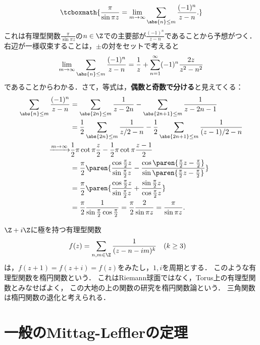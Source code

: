 \documentclass[uplatex, dvipdfmx]{jsreport}
\begin{document}
\begin{example}\mbox{}
        \[\tcboxmath{\frac{\pi}{\sin\pi z}=\lim_{m\to\infty}\sum_{\abs{n}\le m}\frac{(-1)^n}{z-n}.}\]
        これは有理型関数$\frac{\pi}{\sin\pi z}$の$n\in\Z$での主要部が$\frac{(-1)^n}{z-n}$であることから予想がつく．
    右辺が一様収束することは，$\pm$の対をセットで考えると
    \[\lim_{m\to\infty}\sum_{\abs{n}\le m}\frac{(-1)^n}{z-n}=\frac{1}{z}+\sum^\infty_{n=1}(-1)^n\frac{2z}{z^2-n^2}\]
    であることからわかる．さて，等式は，\textbf{偶数と奇数で分ける}と見えてくる：
    \begin{align*}
        \sum_{\abs{n}\le m}\frac{(-1)^n}{z-n}&=\sum_{\abs{2n}\le m}\frac{1}{z-2n}-\sum_{\abs{2n+1}\le m}\frac{1}{z-2n-1}\\
        &=\frac{1}{2}\sum_{\abs{2n}\le m}\frac{1}{z/2-n}-\frac{1}{2}\sum_{\abs{2n+1}\le m}\frac{1}{(z-1)/2-n}\\
        \xrightarrow{m\to\infty}&\frac{1}{2}\pi\cot\pi\frac{z}{2}-\frac{1}{2}\pi\cot\pi\frac{z-1}{2}\\
        &=\frac{\pi}{2}\paren{\frac{\cos\frac{\pi}{2}z}{\sin\frac{\pi}{2}z}-\frac{\cos\paren{\frac{\pi}{2}z-\frac{\pi}{2}}}{\sin\paren{\frac{\pi}{2}z-\frac{\pi}{2}}}}\\
        &=\frac{\pi}{2}\paren{\frac{\cos\frac{\pi}{2}z}{\sin\frac{\pi}{2}z}+\frac{\sin\frac{\pi}{2}z}{\cos\frac{\pi}{2}z}}\\
        &=\frac{\pi}{2}\frac{1}{\sin\frac{\pi}{2}\cos\frac{\pi}{2}}=\frac{\pi}{2}\frac{2}{\sin\pi z}=\frac{\pi}{\sin\pi z}.
    \end{align*}
\end{example}

\begin{example}[極を二次元的に持つ有理型関数は楕円函数]
    $\Z+i\Z$に極を持つ有理型関数
    \begin{align*}
        f(z)&=\sum_{n,m\in\Z}\frac{1}{(z-n-im)^k}\quad(k\ge 3)
    \end{align*}
    は，$f(z+1)=f(z+i)=f(z)$をみたし，$1,i$を周期とする．
    このような有理型関数を楕円関数という．
    これはRiemann球面ではなく，Torus上の有理型関数とみなせばよく，
    この大地の上の関数の研究を楕円関数論という．
    三角関数は楕円関数の退化と考えられる．
\end{example}

\section{一般のMittag-Lefflerの定理}
\end{document}
